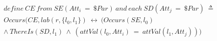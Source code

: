 \begin{align*}%
&define\ CE\ from\ SE(Att_i\ = \ \$Par)\ and\ each\ SD(Att_j\ = \ \$Par)\ \triangleq\\
&Occurs(CE, lab(r, \{l_0, l_1\})\ \leftrightarrow\ (Occurs(SE, l_0)\\
&\wedge\ ThereIs(SD, l_1)\ \wedge\ (attVal(l_0, Att_i)\ =\ attVal(l_1, Att_j)))
\end{align*}

